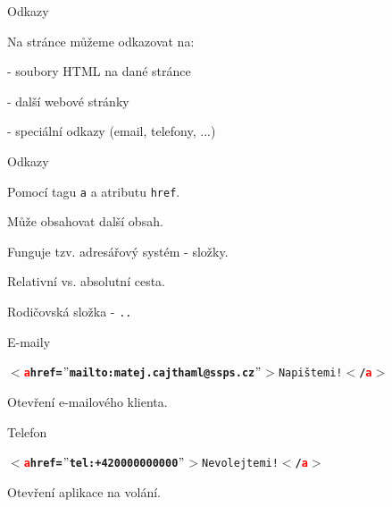 \documentclass[aspectratio=1610]{beamer}
\begin{document}
\begin{frame}{Odkazy}
    \begin{cardTiny}
        \begin{flushleft}
            Na stránce můžeme odkazovat na:

            - soubory HTML na dané stránce
            
            - další webové stránky
            
            - speciální odkazy (email, telefony, ...)
        \end{flushleft}
    \end{cardTiny}
\end{frame}

\begin{frame}{Odkazy}
    \begin{cardTiny}
        \begin{flushleft}
            Pomocí tagu \texttt{a} a atributu \texttt{href}.

            Může obsahovat další obsah.

            Funguje tzv. adresářový systém - složky.

            \vspace{2ex}

            Relativní vs. absolutní cesta.

            Rodičovská složka - \texttt{..}
        \end{flushleft}
    \end{cardTiny}
\end{frame}

\begin{frame}{E-maily}
    \begin{cardTiny}
        \begin{flushleft}
            \begin{alltt}\textbf{$<$\textcolor{red}{a} href=$"$mailto:matej.cajthaml@ssps.cz$"$$>$}Napište mi!\textbf{$<$/\textcolor{red}{a}$>$}\end{alltt}
        
            Otevření e-mailového klienta.
        \end{flushleft}
    \end{cardTiny}
\end{frame}

\begin{frame}{Telefon}
    \begin{cardTiny}
        \begin{flushleft}
            \begin{alltt}\textbf{$<$\textcolor{red}{a} href=$"$tel:+420000000000$"$$>$}Nevolejte mi!\textbf{$<$/\textcolor{red}{a}$>$}\end{alltt}
        
            Otevření aplikace na volání.
        \end{flushleft}
    \end{cardTiny}
\end{frame}
\end{document}

